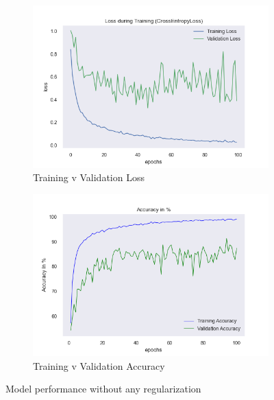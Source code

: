 \documentclass[a4paper]{article}
\begin{document}
\begin{figure}[H]
\centering
\begin{subfigure}{0.5\textwidth}
  \centering
  \includegraphics[width=1\linewidth]{img/baptiste/baptiste_100epoches_val_loss__Dropouts_False__BatchNorm_False.png}
  \caption{Training v Validation Loss}
  \label{fig:sub1}
\end{subfigure}%
\begin{subfigure}{0.5\textwidth}
  \centering
  \includegraphics[width=1\linewidth]{img/baptiste/baptiste_100epoches_train_accuracy__Dropouts_False__BatchNorm_False.png}
  \caption{Training v Validation Accuracy}
  \label{fig:sub2}
\end{subfigure}
\caption{Model performance without any regularization}
\label{fig:without-regularization}
\end{figure}
\end{document}
